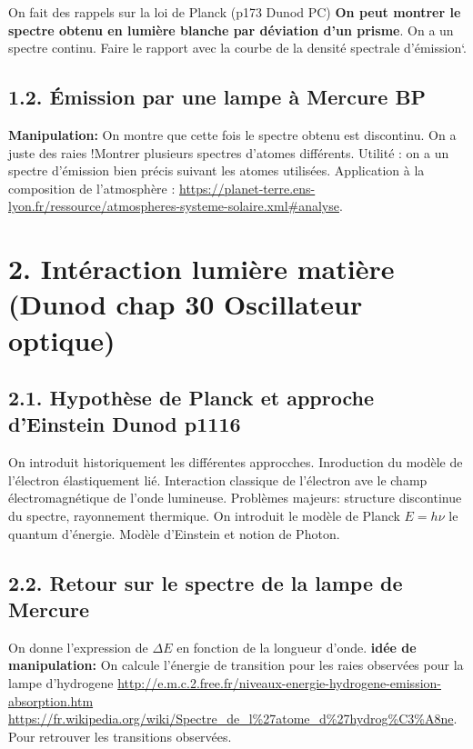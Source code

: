 \documentclass[french, a4paper, 10pt, twocolumn, landscape]{article}
\begin{document}
On fait des rappels sur la loi de Planck (p173 Dunod PC)
\textbf{On peut montrer le spectre obtenu en lumière blanche par déviation d'un prisme}. On a un spectre continu. Faire le rapport avec la courbe de la densité spectrale d'émission`.

\subsection*{1.2. Émission par une lampe à Mercure BP}

\textbf{Manipulation:} On montre que cette fois le spectre obtenu est discontinu. On a juste des raies !Montrer plusieurs spectres d'atomes différents.  Utilité : on a un spectre d'émission bien précis suivant les atomes utilisées. Application à la composition de l'atmosphère : \url{https://planet-terre.ens-lyon.fr/ressource/atmospheres-systeme-solaire.xml#analyse}. 

\section*{2. Intéraction lumière matière (Dunod chap 30 Oscillateur optique)}

\subsection*{2.1. Hypothèse de Planck et approche d'Einstein Dunod p1116}

On introduit historiquement les différentes approcches. Inroduction du modèle de l'électron élastiquement lié. Interaction classique de l'électron ave le champ électromagnétique de l'onde lumineuse. Problèmes majeurs: structure discontinue du spectre, rayonnement thermique. On introduit le modèle de Planck $E = h\nu$ le quantum d'énergie. Modèle d'Einstein et notion de Photon.


\subsection*{2.2. Retour sur le spectre de la lampe de Mercure}

On donne l'expression de $\Delta E$ en fonction de la longueur d'onde. 
\textbf{idée de manipulation:} On calcule l'énergie de transition pour les raies observées pour la lampe d'hydrogene
\url{http://e.m.c.2.free.fr/niveaux-energie-hydrogene-emission-absorption.htm} \url{https://fr.wikipedia.org/wiki/Spectre_de_l%27atome_d%27hydrog%C3%A8ne}. Pour retrouver les transitions observées.
\end{document}
